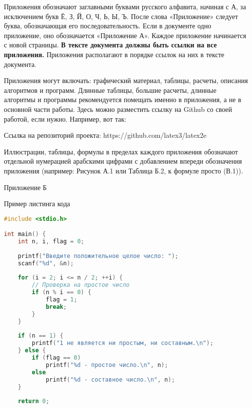 \documentclass{report}
\begin{document}
Приложения обозначают заглавными буквами русского алфавита, начиная с А, за исключением букв Ё, З, Й, О, Ч, Ь, Ы, Ъ. После слова «Приложение» следует буква, обозначающая его последовательность.
Если в документе одно приложение, оно обозначается «Приложение А».
Каждое приложение начинается с новой страницы.
{\bf В тексте документа должны быть ссылки на все приложения.}  Приложения располагают в порядке ссылок на них в тексте документа.

Приложения могут включать: графический материал, таблицы, расчеты, описания алгоритмов и программ. Длинные таблицы, большие расчеты, длинные алгоритмы и программы рекомендуется помещать именно в приложения, а не в основной части работы. Здесь можно разместить ссылку на Github со своей работой, если нужно. Например, вот так:

Ссылка на репозиторий проекта: https://github.com/latex3/latex2e

Иллюстрации, таблицы, формулы в пределах каждого приложения обозначают отдельной нумерацией арабскими цифрами с добавлением впереди обозначения приложения (например: Рисунок А.1 или Таблица Б.2, к формуле просто (В.1)).
\newpage

\begin{flushright}
     Приложение Б
\end{flushright}

\begin{center}  Пример листинга кода \end{center}

\begin{lstlisting}[language=C, frame=single]  
#include <stdio.h>

int main() {
    int n, i, flag = 0;
    
    printf("Введите положительное целое число: ");
    scanf("%d", &n);
    
    for (i = 2; i <= n / 2; ++i) {
        // Проверка на простое число
        if (n % i == 0) {
            flag = 1;
            break;
        }
    }
    
    if (n == 1) {
        printf("1 не является ни простым, ни составным.\n");
    } else {
        if (flag == 0)
            printf("%d - простое число.\n", n);
        else
            printf("%d - составное число.\n", n);
    }
    
    return 0;
\end{lstlisting}
\newpage
\end{document}
